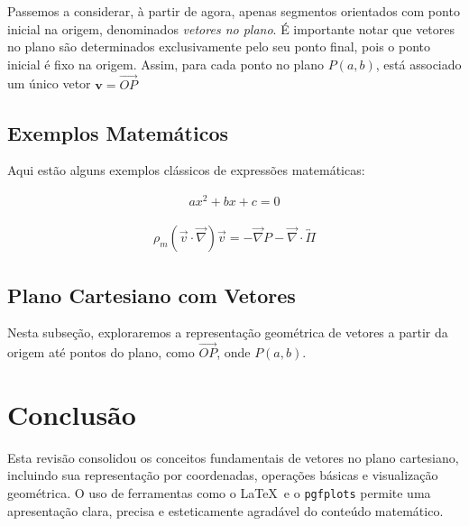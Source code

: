 \documentclass[a4paper,12pt]{article}
\numberwithin{equation}{section}
\begin{document}
Passemos a considerar, à partir de agora, apenas segmentos orientados com ponto inicial na origem, denominados \textit{vetores no plano}. É importante notar que 
vetores no plano são determinados exclusivamente pelo seu ponto final, pois o ponto inicial é fixo na origem. Assim, para cada ponto no plano $P(a,b)$, está associado
um único vetor $\textbf{v} = \overrightarrow{OP}$

\subsection{Exemplos Matemáticos}

Aqui estão alguns exemplos clássicos de expressões matemáticas:

\begin{eqnarray}
	ax^2 + bx + c = 0
\end{eqnarray}

\begin{eqnarray}
	\rho_m\left(\vec{v}\cdot\vec{\nabla}\right)\vec{v}=-\vec{\nabla}P-\vec{\nabla}\cdot\overleftrightarrow{\Pi}
\end{eqnarray}

\subsection{Plano Cartesiano com Vetores}

Nesta subseção, exploraremos a representação geométrica de vetores a partir da origem até pontos do plano, como $\overrightarrow{OP}$, onde $P(a,b)$.


\section{Conclusão}

Esta revisão consolidou os conceitos fundamentais de vetores no plano cartesiano, incluindo sua representação por coordenadas, operações básicas e visualização geométrica. O uso de ferramentas como o \LaTeX\ e o \texttt{pgfplots} permite uma apresentação clara, precisa e esteticamente agradável do conteúdo matemático.
\end{document}
